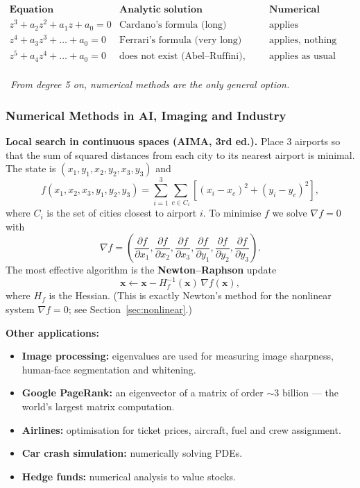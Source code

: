 \documentclass[hidelinks]{article}
\newcommand{\callout}[1]{\par\smallskip\noindent{\color{capri}$\blacktriangleright$}\ \textit{#1}\par\smallskip}
\begin{document}
\[
\begin{array}{lll}
\textbf{Equation} & \textbf{Analytic solution} & \textbf{Numerical (bisection)}\\ \hline
z^3+a_2z^2+a_1z+a_0=0 & \text{Cardano's formula (long)} & \text{applies}\\
z^4+a_3z^3+\dots+a_0=0 & \text{Ferrari's formula (very long)} & \text{applies, nothing changes}\\
z^5+a_4z^4+\dots+a_0=0 & \text{does not exist (Abel--Ruffini), except special cases} & \text{applies as usual}\\
\end{array}
\]

\callout{From degree 5 on, numerical methods are the \emph{only} general option.}

\subsubsection{Numerical Methods in AI, Imaging and Industry}

\textbf{Local search in continuous spaces (AIMA, 3rd ed.).} Place 3 airports so that the sum of squared distances from each city to its nearest airport is minimal. The state is $(x_1,y_1,x_2,y_2,x_3,y_3)$ and
\[
f(x_1,x_2,x_3,y_1,y_2,y_3)=\sum_{i=1}^{3}\sum_{c\in C_i}\left[(x_i-x_c)^2+(y_i-y_c)^2\right],
\]
where $C_i$ is the set of cities closest to airport $i$. To minimise $f$ we solve $\nabla f=0$ with
\[
\nabla f=\left(\frac{\partial f}{\partial x_1},\frac{\partial f}{\partial x_2},\frac{\partial f}{\partial x_3},\frac{\partial f}{\partial y_1},\frac{\partial f}{\partial y_2},\frac{\partial f}{\partial y_3}\right).
\]
The most effective algorithm is the \textbf{Newton--Raphson} update
\[
\mathbf{x}\leftarrow \mathbf{x}-H_f^{-1}(\mathbf{x})\,\nabla f(\mathbf{x}),
\]
where $H_f$ is the Hessian. (This is exactly Newton's method for the nonlinear system $\nabla f=0$; see Section~\ref{sec:nonlinear}.)

\textbf{Other applications:}
\begin{itemize}
    \item \textbf{Image processing:} eigenvalues are used for measuring image sharpness, human-face segmentation and whitening.
    \item \textbf{Google PageRank:} an eigenvector of a matrix of order $\sim 3$ billion --- the world's largest matrix computation.
    \item \textbf{Airlines:} optimisation for ticket prices, aircraft, fuel and crew assignment.
    \item \textbf{Car crash simulation:} numerically solving PDEs.
    \item \textbf{Hedge funds:} numerical analysis to value stocks.
\end{itemize}
\end{document}
